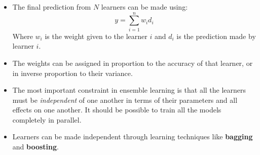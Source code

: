 \documentclass{article}
\theoremstyle{plain}
\theoremstyle{definition}
\begin{document}
\begin{itemize}
\begin{itemize}
        \item The final prediction from $N$ learners can be made using:
        \begin{equation*}
            y = \sum_{i=1}^n w_i d_i
        \end{equation*}
        Where $w_i$ is the weight given to the learner $i$ and $d_i$ is the prediction made by learner $i$. 
        
        \item The weights can be assigned in proportion to the accuracy of that learner, or in inverse proportion to their variance. 
        
        \item The most important constraint in ensemble learning is that all the learners must be \textit{independent} of one another in terms of their parameters and all effects on one another. It should be possible to train all the models completely in parallel.
        
        \item Learners can be made independent through learning techniques like \textbf{bagging} and \textbf{boosting}. 
    \end{itemize}
\end{itemize}
\end{document}
